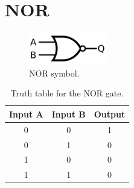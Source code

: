 \section{NOR}
	\begin{figure}[H]
	    \centering
	    \includegraphics[width=0.3\textwidth]{figures/symbols/NOR.png}
	    \caption{NOR symbol.}
	    \label{fig:NOR_sym} 
	\end{figure}

    \begin{table}[ht]
    \centering
    \begin{tabular}{|c|c|c|}
        \hline
        Input A & Input B & Output \\
        \hline
        0 & 0 & 1 \\
        0 & 1 & 0 \\
        1 & 0 & 0 \\
        1 & 1 & 0 \\
        \hline
    \end{tabular}
    \caption{Truth table for the NOR gate.}
    \end{table}